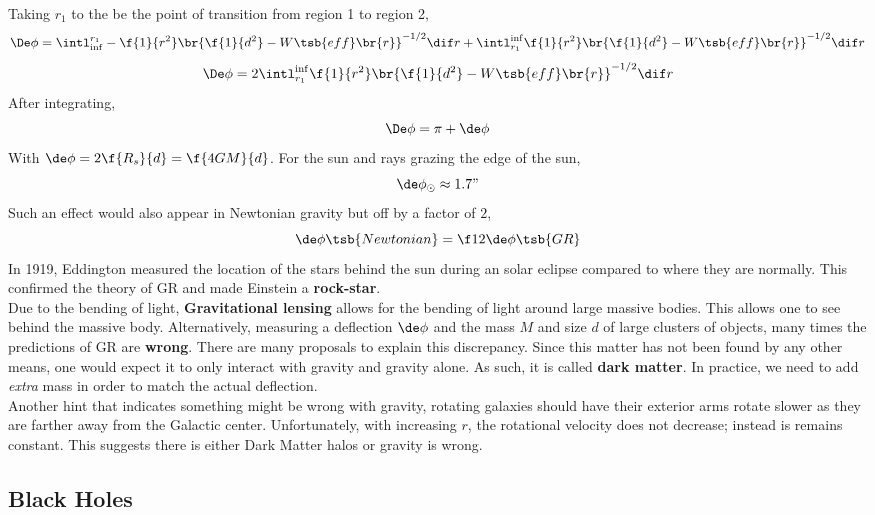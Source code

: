 \documentclass{article}
\begin{document}
Taking $r_1$ to the be the point of transition from region 1 to region 2,
\[ \De \phi = \intl_{\inf}^{r_1} -\f{1}{r^2} \br{\f{1}{d^2} - W\tsb{eff}\br{r}}^{-1/2} \dif r + \intl_{r_1}^{\inf} \f{1}{r^2} \br{\f{1}{d^2} - W\tsb{eff}\br{r}}^{-1/2} \dif r \]
\[ \De \phi = 2\intl_{r_1}^{\inf} \f{1}{r^2} \br{\f{1}{d^2} - W\tsb{eff}\br{r}}^{-1/2} \dif r  \]
After integrating,
\[ \De \phi = \pi + \de \phi \]
With $\de \phi = 2 \f{R_s}{d} = \f{4GM}{d}$. For the sun and rays grazing the edge of the sun,
\[ \de \phi_{\odot} \approx 1.7" \]
Such an effect would also appear in Newtonian gravity but off by a factor of $2$,
\[ \de \phi\tsb{Newtonian} = \f12\de \phi\tsb{GR} \]
In 1919, Eddington measured the location of the stars behind the sun during an solar eclipse compared to where they are normally. This confirmed the theory of GR and made Einstein a \textbf{rock-star}. \\

Due to the bending of light, \textbf{Gravitational lensing} allows for the bending of light around large massive bodies. This allows one to see behind the massive body. Alternatively, measuring a deflection $\de \phi$ and the mass $M$ and size $d$ of large clusters of objects, many times the predictions of GR are \textbf{wrong}. There are many proposals to explain this discrepancy. Since this matter has not been found by any other means, one would expect it to only interact with gravity and gravity alone. As such, it is called \textbf{dark matter}. In practice, we need to add \textit{extra} mass in order to match the actual deflection. \\

Another hint that indicates something might be wrong with gravity, rotating galaxies should have their exterior arms rotate slower as they are farther away from the Galactic center. Unfortunately, with increasing $r$, the rotational velocity does not decrease; instead is remains constant. This suggests there is either Dark Matter halos or gravity is wrong.

\subsection{Black Holes}
\end{document}
